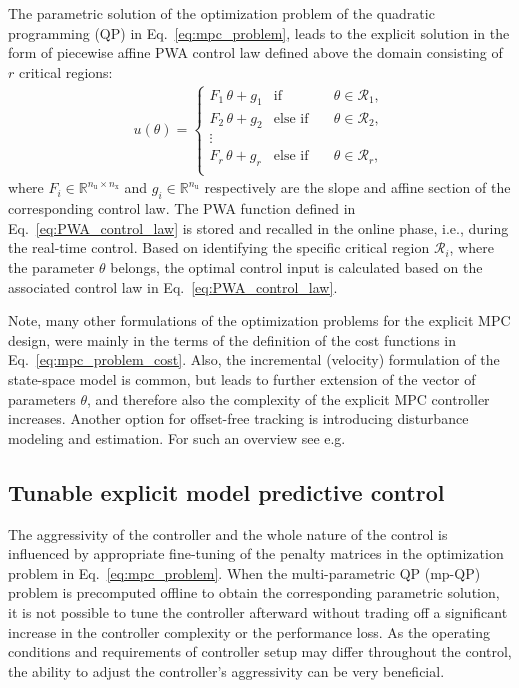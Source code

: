 \documentclass[preprint,12pt]{elsarticle}
\begin{document}
	The parametric solution of the optimization problem of the quadratic programming (QP) in Eq.~\eqref{eq:mpc_problem}, leads to the explicit solution in the form of piecewise affine PWA control law defined above the domain consisting of $r$ critical regions:
	\begin{eqnarray}
		\label{eq:PWA_control_law}
		u(\theta) = \left\{ 
		\begin{matrix}
			F_{1} \, \theta + g_{1} & \mathrm{if} & \quad \theta \in \mathcal{R}_1, \\
			F_{2} \, \theta + g_{2} & \mathrm{else}\,\,\mathrm{if} &\quad \theta \in \mathcal{R}_2, \\
			\vdots & \\
			F_{r} \, \theta + g_{r} & \mathrm{else}\,\,\mathrm{if} & \quad \theta \in \mathcal{R}_{r}, \\
		\end{matrix}
		\right.
	\end{eqnarray}
	where $F_{i} \in \mathbb{R}^{n_{\mathrm{u}} \times n_{\mathrm{x}}}$ and $g_{i}  \in \mathbb{R}^{n_{\mathrm{u}}}$ respectively are the slope and affine section of the corresponding control law. The PWA function defined in Eq.~\eqref{eq:PWA_control_law} is stored and recalled in the online phase, i.e., during the real-time control. Based on identifying the specific critical region $\mathcal{R}_{i}$, where the parameter $\theta$ belongs, the optimal control input is calculated based on the associated control law in Eq.~\eqref{eq:PWA_control_law}.
	
	Note, many other formulations of the optimization problems for the explicit MPC design, were mainly in the terms of the definition of the cost functions in Eq.~\eqref{eq:mpc_problem_cost}. Also, the incremental (velocity) formulation of the state-space model is common, but leads to further extension of the vector of parameters $\theta$, and therefore also the complexity of the explicit MPC controller increases. Another option for offset-free tracking is introducing disturbance modeling and estimation. For such an overview see e.g.~\cite{Klauco_mpc} 
	
	
	\subsection{Tunable explicit model predictive control}
	\label{sec:tunable}
	
	The aggressivity of the controller and the whole nature of the control is influenced by appropriate fine-tuning of the penalty matrices in the optimization problem in Eq.~\eqref{eq:mpc_problem}. When the multi-parametric QP (mp-QP) problem is precomputed offline to obtain the corresponding parametric solution, it is not possible to tune the controller afterward without trading off a significant increase in the controller complexity or the performance loss. As the operating conditions and requirements of controller setup may differ throughout the control, the ability to adjust the controller's aggressivity can be very beneficial.
	
\end{document}
